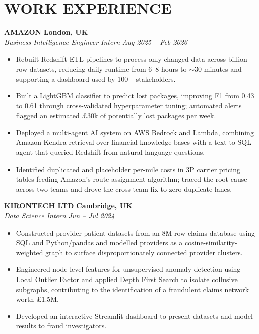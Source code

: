 \documentclass[10pt,a4paper]{article}
\begin{document}

\section*{WORK EXPERIENCE}

\textbf{AMAZON} \hfill \textbf{London, UK}\\
\textit{Business Intelligence Engineer Intern} \hfill \textit{Aug 2025 -- Feb 2026}

\begin{itemize}
    \item Rebuilt Redshift ETL pipelines to process only changed data across billion-row datasets, reducing daily runtime from 6--8 hours to $\sim$30 minutes and supporting a dashboard used by 100+ stakeholders.

    \item Built a LightGBM classifier to predict lost packages, improving F1 from 0.43 to 0.61 through cross-validated hyperparameter tuning; automated alerts flagged an estimated £30k of potentially lost packages per week.

    \item Deployed a multi-agent AI system on AWS Bedrock and Lambda, combining Amazon Kendra retrieval over financial knowledge bases with a text-to-SQL agent that queried Redshift from natural-language questions.

    \item Identified duplicated and placeholder per-mile costs in 3P carrier pricing tables feeding Amazon’s route-assignment algorithm; traced the root cause across two teams and drove the cross-team fix to zero duplicate lanes.


\end{itemize}

\textbf{KIRONTECH LTD} \hfill \textbf{Cambridge, UK}\\
\textit{Data Science Intern} \hfill \textit{Jun -- Jul 2024}

\begin{itemize}
    \item Constructed provider-patient datasets from an 8M-row claims database using SQL and Python/pandas and modelled providers as a cosine-similarity-weighted graph to surface disproportionately connected provider clusters.

    \item Engineered node-level features for unsupervised anomaly detection using Local Outlier Factor and applied Depth First Search to isolate collusive subgraphs, contributing to the identification of a fraudulent claims network worth £1.5M.

    \item Developed an interactive Streamlit dashboard to present datasets and model results to fraud investigators.
\end{itemize}
\end{document}
